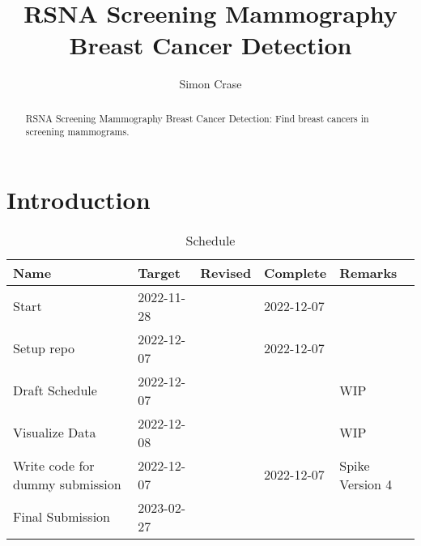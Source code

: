 \documentclass[]{article}
\title{RSNA Screening Mammography Breast Cancer Detection}
\author{Simon Crase}
\begin{document}
\maketitle

\begin{abstract}
RSNA Screening Mammography Breast Cancer Detection: Find breast cancers in screening mammograms. \cite{rsna-breast-cancer-detection}
\end{abstract}

\section{Introduction}
\begin{table}[H]
	\begin{center}
		\caption{Schedule}
		\begin{tabular}{|l|l|l|l|l|} \hline
			Name&Target&Revised&Complete&Remarks \\  \hline
			Start&2022-11-28&&2022-12-07&\\ 		 \hline
			Setup repo&2022-12-07&&2022-12-07&\\ 		 \hline
			Draft Schedule&2022-12-07&&&WIP\\ 		 \hline
			Visualize Data&2022-12-08&&&WIP\\ 		 \hline
			Write code for dummy submission&2022-12-07&&2022-12-07&Spike Version 4\\ 		 \hline
			Final Submission&2023-02-27&&&\\ 		 \hline
		\end{tabular}
	\end{center}
\end{table}



\end{document}
